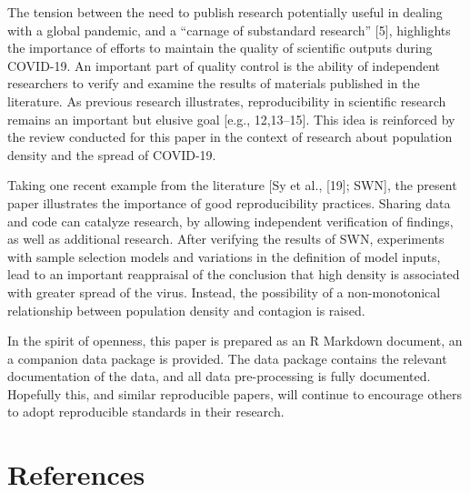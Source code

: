 \documentclass[10pt,letterpaper]{article}
\begin{document}
The tension between the need to publish research potentially useful in
dealing with a global pandemic, and a ``carnage of substandard
research'' {[}5{]}, highlights the importance of efforts to maintain the
quality of scientific outputs during COVID-19. An important part of
quality control is the ability of independent researchers to verify and
examine the results of materials published in the literature. As
previous research illustrates, reproducibility in scientific research
remains an important but elusive goal {[}e.g., 12,13--15{]}. This idea
is reinforced by the review conducted for this paper in the context of
research about population density and the spread of COVID-19.

Taking one recent example from the literature {[}Sy et al., {[}19{]};
SWN{]}, the present paper illustrates the importance of good
reproducibility practices. Sharing data and code can catalyze research,
by allowing independent verification of findings, as well as additional
research. After verifying the results of SWN, experiments with sample
selection models and variations in the definition of model inputs, lead
to an important reappraisal of the conclusion that high density is
associated with greater spread of the virus. Instead, the possibility of
a non-monotonical relationship between population density and contagion
is raised.

In the spirit of openness, this paper is prepared as an R Markdown
document, an a companion data package is provided. The data package
contains the relevant documentation of the data, and all data
pre-processing is fully documented. Hopefully this, and similar
reproducible papers, will continue to encourage others to adopt
reproducible standards in their research.

\hypertarget{references}{%
\section*{References}\label{references}}
\end{document}
